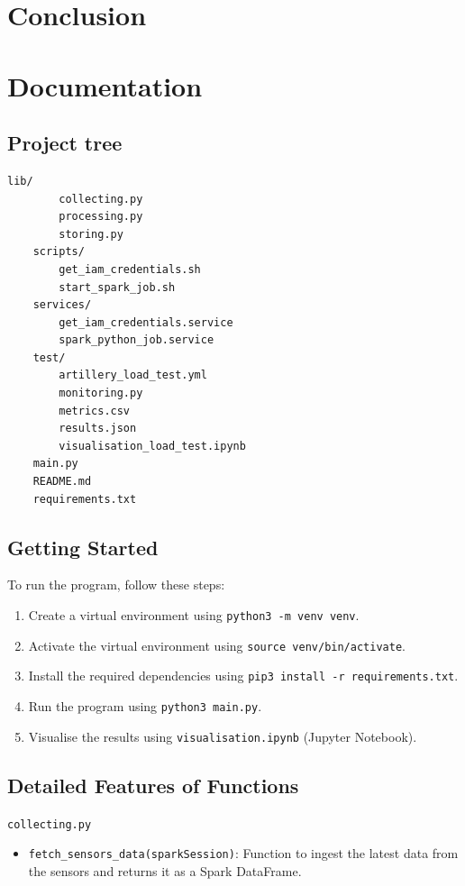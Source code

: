 \documentclass[12pt,oneside]{book} %
\begin{document}
\chapter{Conclusion}




\appendix
\chapter{Documentation}

\begin{subappendices}
    \section{Project tree}
    \begin{lstlisting}[breaklines=true, basicstyle=\small]
    lib/
        collecting.py
        processing.py
        storing.py
    scripts/
        get_iam_credentials.sh
        start_spark_job.sh
    services/
        get_iam_credentials.service
        spark_python_job.service
    test/
        artillery_load_test.yml
        monitoring.py
        metrics.csv
        results.json
        visualisation_load_test.ipynb
    main.py
    README.md
    requirements.txt
    \end{lstlisting}

    \section{Getting Started}
    To run the program, follow these steps:
    \begin{enumerate}
        \itemindent=17.87pt
        \item Create a virtual environment using \texttt{python3 -m venv venv}.
        \item Activate the virtual environment using \texttt{source venv/bin/activate}.
        \item Install the required dependencies using \texttt{pip3 install -r
                  requirements.txt}.
        \item Run the program using \texttt{python3 main.py}.
        \item Visualise the results using \texttt{visualisation.ipynb} (Jupyter Notebook).
    \end{enumerate}

    \section{Detailed Features of Functions}
    \begin{description}
        \item \texttt{collecting.py}
              \begin{itemize}
                  \item \texttt{fetch\_sensors\_data(sparkSession)}: Function to ingest the latest data from the sensors and returns it as a Spark DataFrame.
              \end{itemize}


\end{description}
\end{subappendices}
\end{document}
